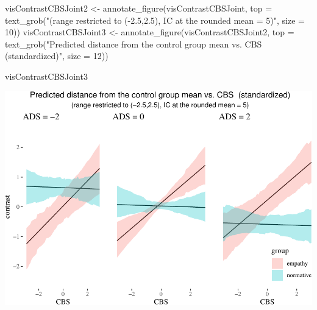 \documentclass[
  10pt,
  dvipsnames,enabledeprecatedfontcommands]{scrartcl}
\newenvironment{Shaded}{\begin{snugshade}}{\end{snugshade}}
\newcommand{\AttributeTok}[1]{\textcolor[rgb]{0.77,0.63,0.00}{#1}}
\newcommand{\DecValTok}[1]{\textcolor[rgb]{0.00,0.00,0.81}{#1}}
\newcommand{\FunctionTok}[1]{\textcolor[rgb]{0.00,0.00,0.00}{#1}}
\newcommand{\NormalTok}[1]{#1}
\newcommand{\OtherTok}[1]{\textcolor[rgb]{0.56,0.35,0.01}{#1}}
\newcommand{\StringTok}[1]{\textcolor[rgb]{0.31,0.60,0.02}{#1}}
\begin{document}
\begin{Shaded}
\begin{Highlighting}[]
\NormalTok{visContrastCBSJoint2 }\OtherTok{\textless{}{-}} \FunctionTok{annotate\_figure}\NormalTok{(visContrastCBSJoint, }
      \AttributeTok{top =} \FunctionTok{text\_grob}\NormalTok{(}\StringTok{"(range restricted to ({-}2.5,2.5), IC at the rounded mean = 5)"}\NormalTok{,}
                                \AttributeTok{size =} \DecValTok{10}\NormalTok{))}
\NormalTok{visContrastCBSJoint3 }\OtherTok{\textless{}{-}} \FunctionTok{annotate\_figure}\NormalTok{(visContrastCBSJoint2, }
\AttributeTok{top =} \FunctionTok{text\_grob}\NormalTok{(}\StringTok{"Predicted distance from the control group mean vs. CBS  (standardized)"}\NormalTok{,}
                                \AttributeTok{size =} \DecValTok{12}\NormalTok{))}

\NormalTok{visContrastCBSJoint3}
\end{Highlighting}
\end{Shaded}

\begin{center}\includegraphics[width=1\linewidth]{bayesianReport3_files/figure-latex/unnamed-chunk-13-1} \end{center}
\normalsize

\vspace{1mm}
\footnotesize
\end{document}
